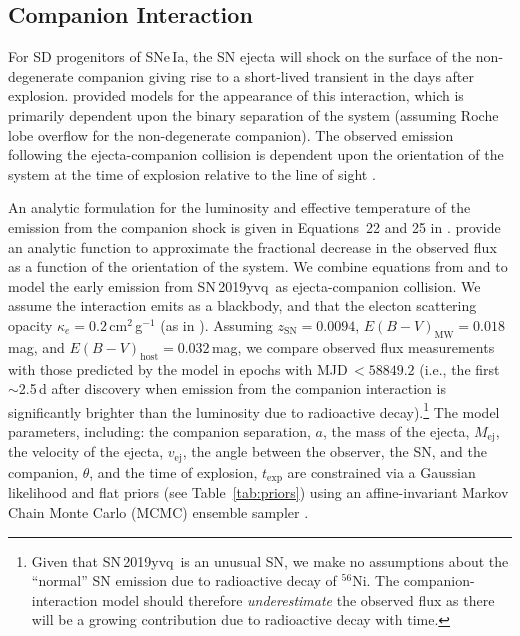 \documentclass[twocolumn]{aastex63}
\newcommand{\radni}{$^{56}$Ni}
\newcommand{\sn}{SN\,2019yvq}
\begin{document}
\subsection{Companion Interaction}

For SD progenitors of SNe\,Ia, the SN ejecta will shock on the surface of the
non-degenerate companion giving rise to a short-lived transient in the days
after explosion. \citet{Kasen10a} provided models for the appearance of this
interaction, which is primarily dependent upon the binary separation of the
system (assuming Roche lobe overflow for the non-degenerate companion). The
observed emission following the ejecta-companion collision is dependent upon
the orientation of the system at the time of explosion relative to the line of
sight \citep{Kasen10a}.

An analytic formulation for the luminosity and effective temperature of the
emission from the companion shock is given in Equations~22 and 25 in
\citet{Kasen10a}. \citet{Brown12} provide an analytic function to approximate
the fractional decrease in the observed flux as a function of the orientation
of the system. We combine equations from \citet{Kasen10a} and \citet{Brown12}
to model the early emission from \sn\ as ejecta-companion collision. We assume
the interaction emits as a blackbody, and that the electon scattering opacity
$\kappa_e = 0.2$\,cm$^{2}$\,g$^{-1}$ (as in \citealt{Kasen10a}). Assuming
$z_\mathrm{SN} = 0.0094$, $E(B-V)_\mathrm{MW} = 0.018$\,mag, and
$E(B-V)_\mathrm{host} = 0.032$\,mag, we compare observed flux measurements
with those predicted by the \citet{Kasen10a} model in epochs with MJD$\,<
58849.2$ (i.e., the first $\sim$2.5\,d after discovery when emission from the
companion interaction is significantly brighter than the luminosity due to
radioactive decay).\footnote{Given that \sn\ is an unusual SN, we make no
assumptions about the ``normal'' SN emission due to radioactive decay of
\radni. The companion-interaction model should therefore
\textit{underestimate} the observed flux as there will be a growing
contribution due to radioactive decay with time.} The model parameters,
including: the companion separation, $a$, the mass of the ejecta,
$M_\mathrm{ej}$, the velocity of the ejecta, $v_\mathrm{ej}$, the angle
between the observer, the SN, and the companion, $\theta$, and the time of
explosion, $t_\mathrm{exp}$ are constrained via a Gaussian likelihood and flat
priors (see Table~\ref{tab:priors}) using an affine-invariant
\citep{Goodman10} Markov Chain Monte Carlo (MCMC) ensemble sampler
\citep{Foreman-Mackey13}.
\end{document}
